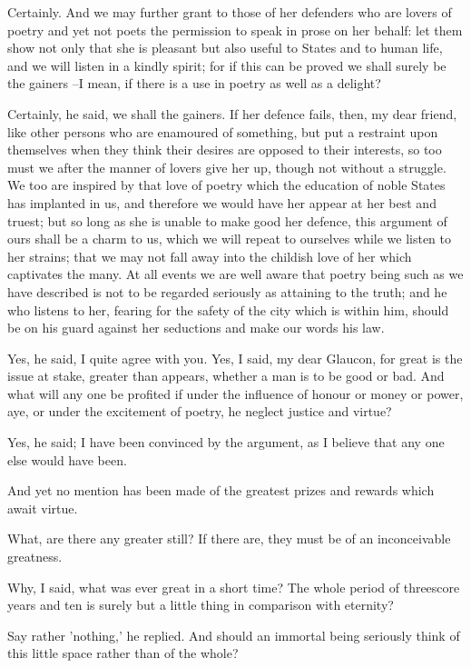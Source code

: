 Certainly.
And we may further grant to those of her defenders who are lovers of poetry and yet not poets the permission to speak in prose on her behalf: let them show not only that she is pleasant but also useful to States and to human life, and we will listen in a kindly spirit; for if this can be proved we shall surely be the gainers --I mean, if there is a use in poetry as well as a delight?

Certainly, he said, we shall the gainers.
If her defence fails, then, my dear friend, like other persons who are enamoured of something, but put a restraint upon themselves when they think their desires are opposed to their interests, so too must we after the manner of lovers give her up, though not without a struggle. We too are inspired by that love of poetry which the education of noble States has implanted in us, and therefore we would have her appear at her best and truest; but so long as she is unable to make good her defence, this argument of ours shall be a charm to us, which we will repeat to ourselves while we listen to her strains; that we may not fall away into the childish love of her which captivates the many. At all events we are well aware that poetry being such as we have described is not to be regarded seriously as attaining to the truth; and he who listens to her, fearing for the safety of the city which is within him, should be on his guard against her seductions and make our words his law.

Yes, he said, I quite agree with you.
Yes, I said, my dear Glaucon, for great is the issue at stake, greater than appears, whether a man is to be good or bad. And what will any one be profited if under the influence of honour or money or power, aye, or under the excitement of poetry, he neglect justice and virtue?

Yes, he said; I have been convinced by the argument, as I believe that any one else would have been.

And yet no mention has been made of the greatest prizes and rewards which await virtue.

What, are there any greater still? If there are, they must be of an inconceivable greatness.

Why, I said, what was ever great in a short time? The whole period of threescore years and ten is surely but a little thing in comparison with eternity?

Say rather 'nothing,' he replied.
And should an immortal being seriously think of this little space rather than of the whole?

